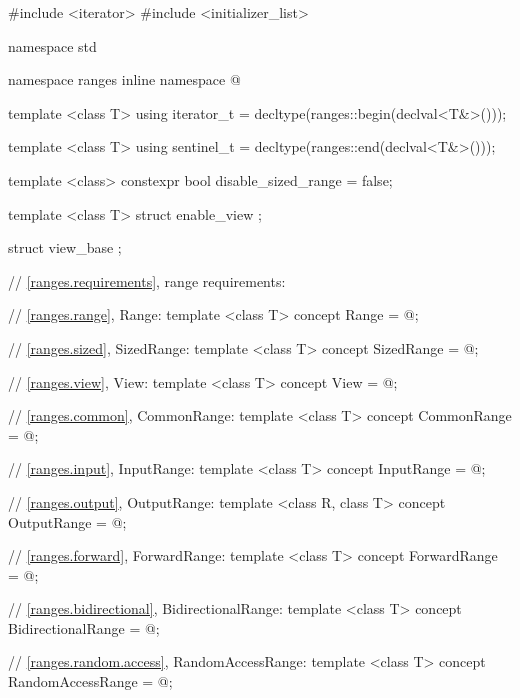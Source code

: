 %
\begin{codeblock}
#include <iterator>
#include <initializer_list>

namespace std {
  namespace ranges {
    inline namespace @
  }

  template <class T>
  using iterator_t = decltype(ranges::begin(declval<T&>()));

  template <class T>
  using sentinel_t = decltype(ranges::end(declval<T&>()));

  template <class>
  constexpr bool disable_sized_range = false;

  template <class T>
  struct enable_view { };

  struct view_base { };

  // \ref{ranges.requirements}, range requirements:

  // \ref{ranges.range}, Range:
  template <class T>
  concept Range = @\seebelow@;

  // \ref{ranges.sized}, SizedRange:
  template <class T>
  concept SizedRange = @\seebelow@;

  // \ref{ranges.view}, View:
  template <class T>
  concept View = @\seebelow@;

  // \ref{ranges.common}, CommonRange:
  template <class T>
  concept CommonRange = @\seebelow@;

  // \ref{ranges.input}, InputRange:
  template <class T>
  concept InputRange = @\seebelow@;

  // \ref{ranges.output}, OutputRange:
  template <class R, class T>
  concept OutputRange = @\seebelow@;

  // \ref{ranges.forward}, ForwardRange:
  template <class T>
  concept ForwardRange = @\seebelow@;

  // \ref{ranges.bidirectional}, BidirectionalRange:
  template <class T>
  concept BidirectionalRange = @\seebelow@;

  // \ref{ranges.random.access}, RandomAccessRange:
  template <class T>
  concept RandomAccessRange = @\seebelow@;
}
\end{codeblock}

